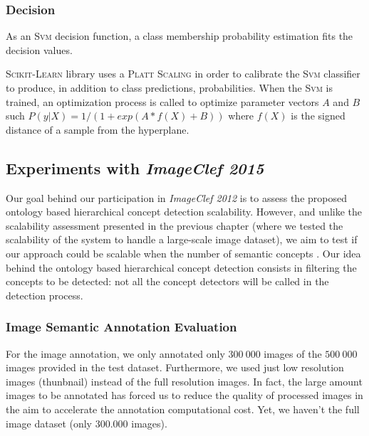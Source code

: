 			\subsubsection{Decision}

				As an \textsc{Svm} decision function, a class membership probability estimation 
				fits the decision values.
		
				\textsc{Scikit-Learn} library uses a \textsc{Platt Scaling} in order to 
				calibrate the \textsc{Svm} classifier to produce, in addition to class 
				predictions, probabilities. When the \textsc{Svm} is trained, an optimization 
				process is called to optimize parameter vectors $A$ and $B$ such 
				$P(y|X) = 1/ (1+exp(A*f(X) + B))$ where $f(X)$ 
				is the signed distance of a sample  from the hyperplane.

			

		\subsection{Experiments with \textit{ImageClef 2015}}

			Our goal behind our participation in \textit{ImageClef 2012} is to assess the proposed 
			ontology based hierarchical concept detection scalability. However, and unlike the 
			scalability assessment presented in the previous chapter (where we tested the 
			scalability of the system to handle a large-scale image dataset), we aim to test if 
			our approach could be scalable when the number of semantic concepts . Our idea 
			behind the ontology based hierarchical concept detection consists in filtering the 
			concepts to be detected: not all the concept detectors will be called in the detection process.



			\subsubsection{Image Semantic Annotation Evaluation}
			For the image annotation, we only annotated only $300~000$ images of 
			the $500~000$ images provided in the test dataset. Furthermore, we used just 
			low resolution images (thunbnail)
			instead of the full resolution images. In fact, the large amount  images to 
			be annotated has forced us to reduce the quality of processed images in the 
			aim to accelerate the annotation computational cost. Yet, we haven't  the full image dataset (only $300.000$ images).

